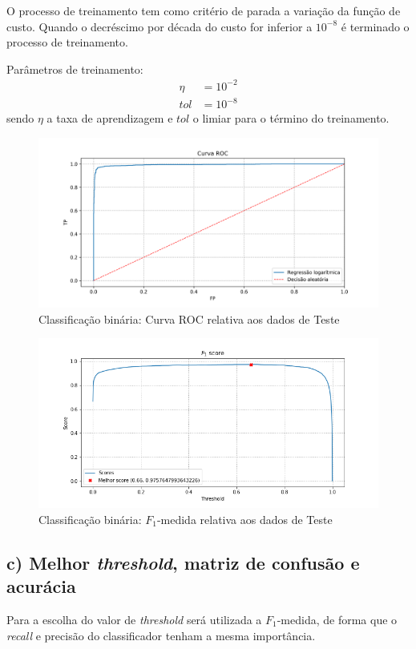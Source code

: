\documentclass{article}
\begin{document}
        O processo de treinamento tem como critério de parada a variação da função de custo. Quando
        o decréscimo por década do custo for inferior a $10^{-8}$ é terminado o processo de treinamento.

        Parâmetros de treinamento:
        \begin{align*}
            \eta&=10^{-2} \\
            tol&=10^{-8}
        \end{align*}
        sendo $\eta$ a taxa de aprendizagem e $tol$ o limiar para o término do treinamento.
        \begin{figure}[H]
            \centering
            \includegraphics[width=\textwidth]{img1/roc.png}
            \caption{Classificação binária: Curva ROC relativa aos dados de Teste}
            \label{fig:a_roc}
        \end{figure}
        \begin{figure}[H]
            \centering
            \includegraphics[width=\textwidth]{img1/f1_score.png}
            \caption{Classificação binária: $F_1$-medida relativa aos dados de Teste}
            \label{fig:a_fi_score}
        \end{figure}
    
    \subsection[]{c) Melhor \textit{threshold}, matriz de confusão e acurácia}
    Para a escolha do valor de \textit{threshold} será utilizada a $F_1$-medida, de forma que
    o \textit{recall} e precisão do classificador tenham a mesma importância.
\end{document}
